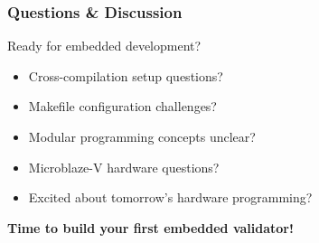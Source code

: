 \documentclass{beamer}
\begin{document}
\begin{frame}
\frametitle{Questions \& Discussion}
\begin{center}
\Large Ready for embedded development?
\end{center}

\begin{itemize}
    \item Cross-compilation setup questions?
    \item Makefile configuration challenges?
    \item Modular programming concepts unclear?
    \item Microblaze-V hardware questions?
    \item Excited about tomorrow's hardware programming?
\end{itemize}

\vspace{1cm}
\begin{center}
\textbf{Time to build your first embedded validator!}
\end{center}
\end{frame}
\end{document}
